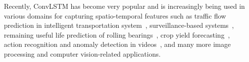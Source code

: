 \begin{sloppypar}
	Recently, ConvLSTM has become very popular and is increasingly being used 
	in various domains for capturing spatio-temporal features such as traffic 
	flow prediction in intelligent transportation system~\cite{yu2017spatio}, 
	surveillance-based systems~\cite{mugunga2021frame}, remaining useful life 
	prediction of rolling bearings~\cite{li2021self}, crop yield 
	forecasting~\cite{gavahi2021deepyield}, action recognition and anomaly 
	detection in videos~\cite{medel2016anomaly, xue2019attention}, and many 
	more image processing and computer vision-related applications.
\end{sloppypar}
